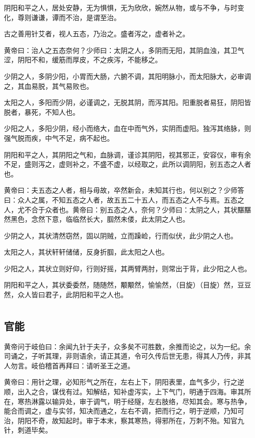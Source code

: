 \documentclass[a4paper,12pt,UTF8,twoside]{ctexbook}
\begin{document}
	阴阳和平之人，居处安静，无为惧惧，无为欣欣，婉然从物，或与不争，与时变化，尊则谦谦，谭而不治，是谓至治。
	
	古之善用针艾者，视人五态，乃治之。盛者泻之，虚者补之。
	
	黄帝曰：治人之五态奈何？少师曰：太阴之人，多阴而无阳，其阴血浊，其卫气涩，阴阳不和，缓筋而厚皮，不之疾泻，不能移之。
	
	少阴之人，多阴少阳，小胃而大肠，六腑不调，其阳明脉小，而太阳脉大，必审调之，其血易脱，其气易败也。
	
	太阳之人，多阳而少阴，必谨调之，无脱其阴，而泻其阳。阳重脱者易狂，阴阳皆脱者，暴死，不知人也。
	
	少阳之人，多阳少阴，经小而络大，血在中而气外，实阴而虚阳。独泻其络脉，则强气脱而疾，中气不足，病不起也。
	
	阴阳和平之人，其阴阳之气和，血脉调，谨诊其阴阳，视其邪正，安容仪，审有余不足，盛则泻之，虚则补之，不盛不虚，以经取之，此所以调阴阳，别五态之人者也。
	
	黄帝曰：夫五态之人者，相与毋故，卒然新会，未知其行也，何以别之？少师答曰：众人之属，不知五态之人者，故五五二十五人，而五态之人不与焉。五态之人，尤不合于众者也。黄帝曰：别五态之人，奈何？少师曰：太阴之人，其状黮黮然黑色，念然下意，临临然长大，腘然未偻，此太阴之人也。
	
	少阴之人，其状清然窃然，固以阴贼，立而躁崄，行而似伏，此少阴之人也。
	
	太阳之人，其状轩轩储储，反身折腘，此太阳之人也。
	
	少阳之人，其状立则好仰，行则好摇，其两臂两肘，则常出于背，此少阳之人也。
	
	阴阳和平之人，其状委委然，随随然，颙颙然，愉愉然，（目旋）（目旋）然，豆豆然，众人皆曰君子，此阴阳和平之人也。
	
	\part{}
	\chapter{官能}
	
	黄帝问于岐伯曰：余闻九针于夫子，众多矣不可胜数，余推而论之，以为一纪。余司诵之，子听其理，非则语余，请正其道，令可久传后世无患，得其人乃传，非其人勿言。岐伯稽首再拜曰：请听圣王之道。
	
	黄帝曰：用针之理，必知形气之所在，左右上下，阴阳表里，血气多少，行之逆顺，出入之合，谋伐有过。知解结，知补虚泻实，上下气门，明通于四海。审其所在，寒热淋露以输异处，审于调气，明于经隧，左右肢络，尽知其会。寒与热争，能合而调之，虚与实邻，知决而通之，左右不调，把而行之，明于逆顺，乃知可治，阴阳不奇，故知起时。审于本末，察其寒热，得邪所在，万刺不殆。知官九针，刺道毕矣。
	
\end{document}
